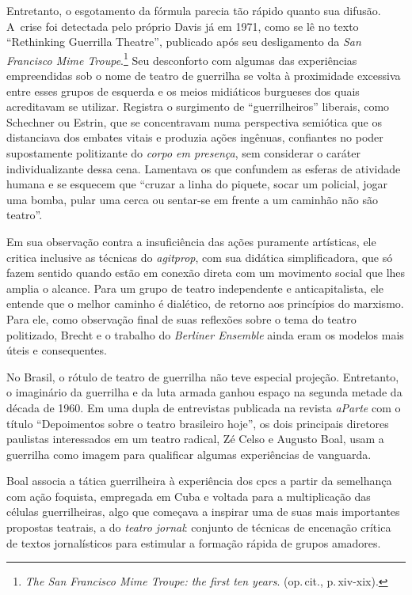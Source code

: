 Entretanto, o esgotamento da fórmula parecia tão rápido quanto sua
difusão. A~crise foi detectada pelo próprio Davis já em 1971, como se lê
no texto “Rethinking Guerrilla Theatre”, publicado após seu
desligamento da {\it San Francisco Mime Troupe}.\footnote{{\it The San Francisco Mime Troupe: the first ten years}.
  (op.\,cit., p.\,xiv-xix).} Seu desconforto com algumas das experiências
empreendidas sob o nome de teatro de guerrilha se volta à
proximidade excessiva entre esses grupos de esquerda e os meios
midiáticos burgueses dos quais acreditavam se utilizar. Registra o
surgimento de “guerrilheiros” liberais, como Schechner ou Estrin, que se
concentravam numa perspectiva semiótica que os distanciava dos embates
vitais e produzia ações ingênuas, confiantes no poder supostamente
politizante do {\it corpo em presença}, sem considerar o caráter
individualizante dessa cena. Lamentava os que confundem as esferas de
atividade humana e se esquecem que “cruzar a linha do piquete, socar um
policial, jogar uma bomba, pular uma cerca ou sentar-se em frente a um
caminhão não são teatro”.

Em sua observação contra a insuficiência das ações puramente artísticas,
ele critica inclusive as técnicas do {\it agitprop}, com sua didática
simplificadora, que só fazem sentido quando estão em conexão direta com
um movimento social que lhes amplia o alcance. Para um grupo de teatro
independente e anticapitalista, ele entende que o melhor caminho é
dialético, de retorno aos princípios do marxismo. Para ele, como
observação final de suas reflexões sobre o tema do teatro politizado,
Brecht e o trabalho do {\it Berliner Ensemble} ainda eram os modelos mais
úteis e consequentes.

\subject{Brasil: a guerrilha no teatro}

No Brasil, o rótulo de teatro de guerrilha não teve especial projeção.
Entretanto, o imaginário da guerrilha e da luta armada ganhou espaço na
segunda metade da década de 1960. Em uma dupla de entrevistas publicada
na revista {\it aParte} com o título “Depoimentos sobre o teatro
brasileiro hoje”, os dois principais diretores paulistas interessados em
um teatro radical, Zé Celso e Augusto Boal, usam a guerrilha como imagem
para qualificar algumas experiências de vanguarda.

Boal associa a tática guerrilheira à experiência dos {\sc cpc}s a partir da
semelhança com ação foquista, empregada em Cuba e voltada para a
multiplicação das células guerrilheiras, algo que começava
a inspirar uma de suas mais importantes propostas teatrais, a do
{\it teatro jornal}: conjunto de técnicas de encenação crítica de textos
jornalísticos para estimular a formação rápida de grupos
amadores.

